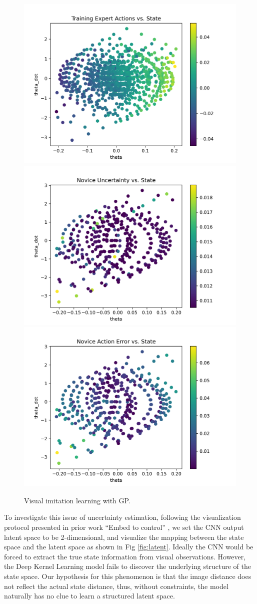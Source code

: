 \documentclass[11pt, reqno, letterpaper, twoside]{amsart}
\begin{document}
\begin{figure}[ht]
	\centering
	\includegraphics[width=0.32\linewidth]{imgs/expert_data_0.png}
	\includegraphics[width=0.32\linewidth]{imgs/novice_uncertainty_0.png}
	\includegraphics[width=0.32\linewidth]{imgs/novice_error_0.png}
	\caption{Visual imitation learning with GP.}
	\label{fig:visual-il}
\end{figure}

To investigate this issue of uncertainty estimation, following the visualization protocol presented in prior work ``Embed to control'' \cite{watter2015embed}, we set the CNN output latent space to be 2-dimensional, and visualize the mapping between the state space and the latent space as shown in Fig \ref{fig:latent}. Ideally the CNN would be forced to extract the true state information from visual observations. However, the Deep Kernel Learning model fails to discover the underlying structure of the state space. Our hypothesis for this phenomenon is that the image distance does not reflect the actual state distance, thus, without constraints, the model naturally has no clue to learn a structured latent space.
\end{document}
